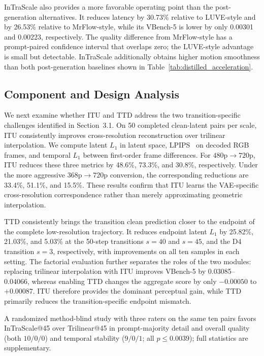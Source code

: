 \documentclass[letterpaper]{article} %
\begin{document}
InTraScale also provides a more favorable operating point than the
post-generation alternatives. It reduces latency by 30.73\% relative to
LUVE-style and by 26.53\% relative to MrFlow-style, while its VBench-5 is lower
by only 0.00301 and 0.00223, respectively. The quality difference from
MrFlow-style has a prompt-paired confidence interval that overlaps zero; the
LUVE-style advantage is small but detectable. InTraScale additionally obtains
higher motion smoothness than both post-generation baselines shown in
Table~\ref{tab:distilled_acceleration}.

\subsection{Component and Design Analysis}
\label{sec:component_analysis}

We next examine whether ITU and TTD address the two transition-specific
challenges identified in Section~3.1. On 50 completed clean-latent pairs per scale, ITU consistently improves
cross-resolution reconstruction over trilinear interpolation. We compute
latent \(L_1\) in latent space, LPIPS~\citep{zhang2018lpips} on decoded RGB
frames, and temporal \(L_1\) between first-order frame differences. For
\(480\mathrm{p}\rightarrow720\mathrm{p}\), ITU reduces these three metrics by
48.6\%, 73.3\%, and 30.8\%, respectively. Under the more aggressive
\(368\mathrm{p}\rightarrow720\mathrm{p}\) conversion, the corresponding
reductions are 33.4\%, 51.1\%, and 15.5\%. These results confirm that ITU
learns the VAE-specific cross-resolution correspondence rather than merely
approximating geometric interpolation.

TTD consistently brings the transition clean prediction closer to the endpoint of the
complete low-resolution trajectory. It reduces endpoint latent \(L_1\) by
25.82\%, 21.03\%, and 5.03\% at the 50-step transitions \(s=40\) and
\(s=45\), and the D4 transition \(s=3\), respectively, with improvements on
all ten samples in each setting. The
factorial evaluation further separates the roles of the two modules:
replacing trilinear interpolation with ITU improves VBench-5 by
0.03085--0.04066, whereas enabling TTD changes the aggregate score by only
\(-0.00050\) to \(+0.00087\). ITU therefore provides the dominant perceptual
gain, while TTD primarily reduces the transition-specific endpoint mismatch.

A randomized method-blind study with three raters on the same ten pairs favors
InTraScale@45 over Trilinear@45 in prompt-majority detail and overall quality
(both \(10/0/0\)) and temporal stability (\(9/0/1\); all
\(p\leq0.0039\)); full statistics are supplementary.
\end{document}
